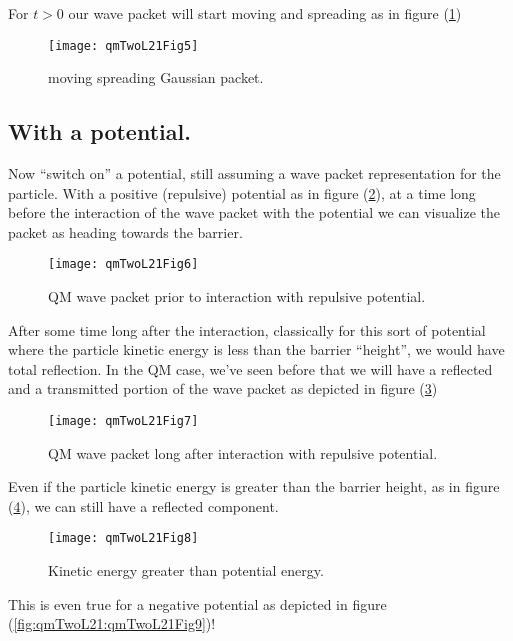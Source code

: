 For $t > 0$ our wave packet will start moving and spreading as in figure (\ref{fig:qmTwoL21:qmTwoL21Fig5})
\begin{figure}[htp]
   \centering
   \texttt{[image: qmTwoL21Fig5]}
   \caption{moving spreading Gaussian packet.}\label{fig:qmTwoL21:qmTwoL21Fig5}
\end{figure}

\subsection{With a potential.}

Now ``switch on'' a potential, still assuming a wave packet representation for the particle.  With a positive (repulsive) potential as in figure (\ref{fig:qmTwoL21:qmTwoL21Fig6}), at a time long before the interaction of the wave packet with the potential we can visualize the packet as heading towards the barrier.

\begin{figure}[htp]
   \centering
   \texttt{[image: qmTwoL21Fig6]}
   \caption{QM wave packet prior to interaction with repulsive potential.}\label{fig:qmTwoL21:qmTwoL21Fig6}
\end{figure}

After some time long after the interaction, classically for this sort of potential where the particle kinetic energy is less than the barrier ``height'', we would have total reflection.  In the QM case, we've seen before that we will have a reflected and a transmitted portion of the wave packet as depicted in figure (\ref{fig:qmTwoL21:qmTwoL21Fig7})
\begin{figure}[htp]
   \centering
   \texttt{[image: qmTwoL21Fig7]}
   \caption{QM wave packet long after interaction with repulsive potential.}\label{fig:qmTwoL21:qmTwoL21Fig7}
\end{figure}

Even if the particle kinetic energy is greater than the barrier height, as in figure (\ref{fig:qmTwoL21:qmTwoL21Fig8}), we can still have a reflected component.
\begin{figure}[htp]
   \centering
   \texttt{[image: qmTwoL21Fig8]}
   \caption{Kinetic energy greater than potential energy.}\label{fig:qmTwoL21:qmTwoL21Fig8}
\end{figure}

This is even true for a negative potential as depicted in figure (\ref{fig:qmTwoL21:qmTwoL21Fig9})!

